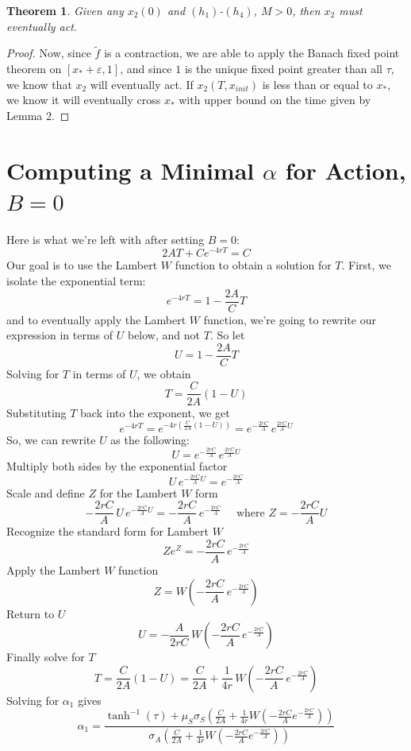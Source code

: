 \documentclass[preprint,12pt]{elsarticle}
\newcommand{\lt}{\left}
\newcommand{\rt}{\right}
\newcommand{\wt}{\widetilde}
\newcommand{\eps}{\varepsilon}
\newtheorem{theorem}{Theorem}
\begin{document}
\begin{theorem}
Given any $x_2(0)$ and $(h_1)$-$(h_4)$, $M>0$, then $x_2$ must eventually act.
\end{theorem}
\begin{proof} Now, since $\wt f$ is a contraction, we are able to apply the Banach fixed point theorem on $[x_* + \eps, 1]$, and since $1$ is the unique fixed point greater than all $\tau$, we know that $x_2$ will eventually act. If $x_2(T,x_{init})$ is less than or equal to $x_*$, we know it will eventually cross $x_*$ with upper bound on the time given by Lemma 2. \end{proof}

\section{Computing a Minimal $\alpha$ for Action, $B = 0$}\label{app:lambert}

Here is what we're left with after setting $B = 0$:
\[
2AT + C e^{-4rT} = C
\]
Our goal is to use the Lambert $W$ function to obtain a solution for $T$. First, we isolate the exponential term:
\[
e^{-4rT} = 1 - \frac{2A}{C}T
\]
and to eventually apply the Lambert $W$ function, we're going to rewrite our expression in terms of $U$ below, and not $T$. So let
\[
U = 1 - \frac{2A}{C}T
\]
Solving for $T$ in terms of $U$, we obtain
\[
T = \frac{C}{2A}(1 - U)
\]
Substituting $T$ back into the exponent, we get
\[
e^{-4rT}
= e^{-4r\lt(\frac{C}{2A}(1 - U)\rt)}
= e^{-\frac{2rC}{A}}\,e^{\frac{2rC}{A}U}
\]
So, we can rewrite $U$ as the following:
\[
U = e^{-\frac{2rC}{A}}\,e^{\frac{2rC}{A}U}
\]
Multiply both sides by the exponential factor
\[
U\,e^{-\frac{2rC}{A}U} = e^{-\frac{2rC}{A}}
\]
Scale and define $Z$ for the Lambert $W$ form
\[
-\frac{2rC}{A}\,U\,e^{-\frac{2rC}{A}U}
= -\frac{2rC}{A}\,e^{-\frac{2rC}{A}}
\quad\text{ where }Z = -\frac{2rC}{A}U
\]
Recognize the standard form for Lambert $W$
\[
Z e^Z = -\frac{2rC}{A}\,e^{-\frac{2rC}{A}}
\]
Apply the Lambert $W$ function
\[
 Z = W\!\lt(-\frac{2rC}{A}\,e^{-\frac{2rC}{A}}\rt)
\]
Return to $U$
\[
U = -\frac{A}{2rC}\,W\!\lt(-\frac{2rC}{A}\,e^{-\frac{2rC}{A}}\rt)
\]
Finally solve for $T$
\[
T = \frac{C}{2A}(1 - U)
= \frac{C}{2A}
+ \frac{1}{4r}\,W\!\lt(-\frac{2rC}{A}\,e^{-\frac{2rC}{A}}\rt)
\]
Solving for $\alpha_1$ gives
\[
\alpha_1
=
\frac
{
  \tanh^{-1}(\tau)
  +
  \mu_S\sigma_S
  \lt(\frac{C}{2A} + \frac{1}{4r}W\!\lt(-\frac{2rC}{A}e^{-\frac{2rC}{A}}\rt)\rt)
}
{
  \sigma_A
  \lt(\frac{C}{2A} + \frac{1}{4r}W\!\lt(-\frac{2rC}{A}e^{-\frac{2rC}{A}}\rt)\rt)
}
\]
\end{document}

